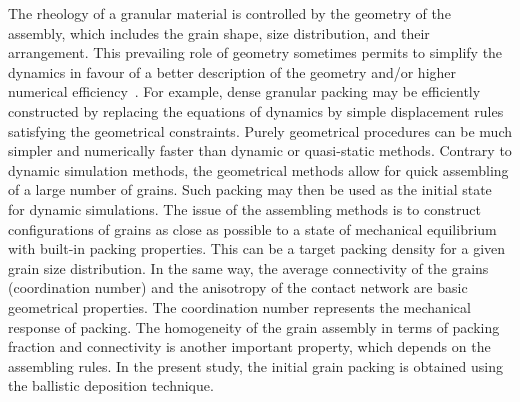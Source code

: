 The rheology of a granular material is controlled by the geometry of the 
assembly, which includes the grain shape, size distribution, and their 
arrangement. This prevailing role of geometry sometimes permits to simplify the 
dynamics in favour of a better description of the geometry 
and/or higher numerical efficiency~\citep{Radjai2011}. For example, dense 
granular packing may be efficiently constructed by replacing the equations of 
dynamics by simple displacement rules satisfying the geometrical constraints. 
Purely geometrical procedures can be much simpler and numerically faster than 
dynamic or quasi-static methods. Contrary to dynamic simulation methods, 
the geometrical methods allow for quick assembling of a large number of 
grains. Such packing may then be used as the initial state for dynamic 
simulations. The issue of the assembling methods is to construct configurations 
of grains as close as possible to a state of mechanical equilibrium with 
built-in packing properties. This can be a target packing density for a 
given grain size distribution. In the same way, the average connectivity of the 
grains (coordination number) and the anisotropy of the contact network are 
basic geometrical properties. The coordination number represents the mechanical 
response of packing. The homogeneity of the grain assembly in terms of 
packing fraction and connectivity is another important property, which depends 
on the assembling rules. In the present study, the initial grain packing is 
obtained using the ballistic deposition technique.


